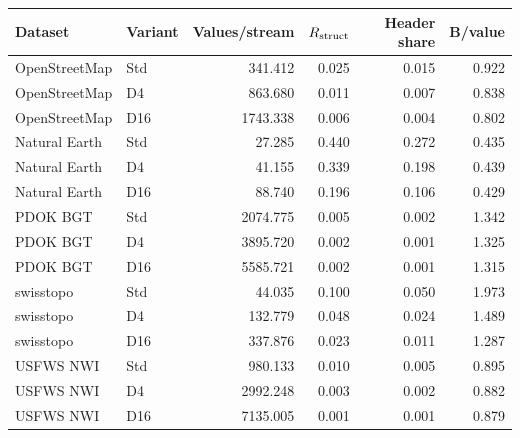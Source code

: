 \begingroup\small\setlength{\tabcolsep}{3pt}
\begin{longtable}{llrrrr}
\toprule
Dataset & Variant & Values/stream & $R_{\rm struct}$ & Header share & B/value \\
\midrule
OpenStreetMap & Std & 341.412 & 0.025 & 0.015 & 0.922 \\
OpenStreetMap & D4 & 863.680 & 0.011 & 0.007 & 0.838 \\
OpenStreetMap & D16 & 1743.338 & 0.006 & 0.004 & 0.802 \\
Natural Earth & Std & 27.285 & 0.440 & 0.272 & 0.435 \\
Natural Earth & D4 & 41.155 & 0.339 & 0.198 & 0.439 \\
Natural Earth & D16 & 88.740 & 0.196 & 0.106 & 0.429 \\
PDOK BGT & Std & 2074.775 & 0.005 & 0.002 & 1.342 \\
PDOK BGT & D4 & 3895.720 & 0.002 & 0.001 & 1.325 \\
PDOK BGT & D16 & 5585.721 & 0.002 & 0.001 & 1.315 \\
swisstopo & Std & 44.035 & 0.100 & 0.050 & 1.973 \\
swisstopo & D4 & 132.779 & 0.048 & 0.024 & 1.489 \\
swisstopo & D16 & 337.876 & 0.023 & 0.011 & 1.287 \\
USFWS NWI & Std & 980.133 & 0.010 & 0.005 & 0.895 \\
USFWS NWI & D4 & 2992.248 & 0.003 & 0.002 & 0.882 \\
USFWS NWI & D16 & 7135.005 & 0.001 & 0.001 & 0.879 \\
\bottomrule
\end{longtable}
\endgroup
